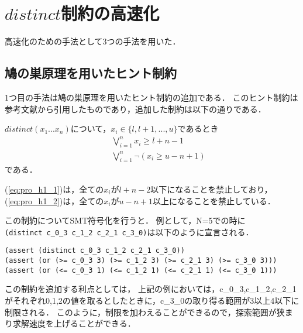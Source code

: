 \section{$distinct$制約の高速化}\label{sec:pro_hint}

高速化のための手法として3つの手法を用いた．

\subsection{鳩の巣原理を用いたヒント制約}\label{sec:pro_hint_1}
1つ目の手法は鳩の巣原理を用いたヒント制約の追加である．
このヒント制約は参考文献\cite{Tamura:queen}から引用したものであり，追加した制約は以下の通りである．

$distinct(x_1 ... x_n)$について，$x_i \in \{l, l+1, ..., u\}$であるとき
\begin{eqnarray}
&& \bigvee_{i=1}^n   x_i \geq l+n-1\\
\label{eq:pro_h1_1}
&& \bigvee_{i=1}^n \lnot(x_i \geq u-n+1)
\label{eq:pro_h1_2}
\end{eqnarray}
である．

(\ref{eq:pro_h1_1})は，全ての$x_i$が$l+n-2$以下になることを禁止しており，
(\ref{eq:pro_h1_2})は，全ての$x_i$が$u-n+1$以上になることを禁止している．

この制約についてSMT符号化を行うと．
例として，N=5での時に\\
\verb|(distinct c_0_3 c_1_2 c_2_1 c_3_0)|は以下のように宣言される．

\begin{verbatim}
(assert (distinct c_0_3 c_1_2 c_2_1 c_3_0))
(assert (or (>= c_0_3 3) (>= c_1_2 3) (>= c_2_1 3) (>= c_3_0 3)))
(assert (or (<= c_0_3 1) (<= c_1_2 1) (<= c_2_1 1) (<= c_3_0 1)))
\end{verbatim}

この制約を追加する利点としては，
上記の例においては，c\_0\_3,c\_1\_2,c\_2\_1がそれぞれ0,1,2の値を取るとしたときに，c\_3\_0の取り得る範囲が3以上4以下に制限される．
このように，制限を加わえることができるので，探索範囲が狭まり求解速度を上げることができる．



